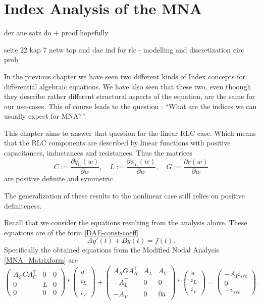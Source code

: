 \chapter{Index Analysis of the MNA}

der ane satz do + proof hopefully

seite 22 kap 7 netw top and dae ind for rlc - modelling and discretization circ prob

In the previous chapter we have seen two different kinds of Index concepts for differential algebraic equations. We have also seen that these two, even thoough they describe rather different structural aspects of the equation, are the same for our use-cases. This of course leads to the question : ``What are the indices we can usually expect for MNA?''.

This chapter aims to answer that question for the linear RLC case. Which means that the RLC components are described by linear functions with positive capacitances, inductances and resistances. Thus the matrices
\begin{displaymath}
	C:=\frac{\partial q_C(w)}{\partial w}, \quad L:=\frac{\partial \phi_L(w)}{\partial w}, \quad G:=\frac{\partial r(w)}{\partial w}
\end{displaymath}
are positive definite and symmetric.

The generalization of these results to the nonlinear case still relies on positive definiteness.

Recall that we consider the equations resulting from the analysis above. These equations are of the form \ref{DAE-const-coeff}
\begin{displaymath}
	A y'(t) + B y(t) = f(t).
\end{displaymath}
Specifically the obtained equations from the Modified Nodal Analysis \ref{MNA_Matrixform} are
\begin{displaymath}
	\begin{pmatrix}
		A_C C A_C^\top & 0 & 0 \\
		0 & L & 0 \\
		0 & 0 & 0
	\end{pmatrix}
	*
	\begin{pmatrix}
		\dot{u} \\
		\dot{i_L} \\
		\dot{i_V}
	\end{pmatrix}
	+
	\begin{pmatrix}
		A_R G A_R^\top & A_L & A_V \\
		-A_L^\top & 0 & 0 \\
		-A_V^\top & 0 & 0 ä
	\end{pmatrix}
	*
	\begin{pmatrix}
		u \\
		i_L \\
		i_V
	\end{pmatrix}
	=
	\begin{pmatrix}
		-A_I i_{src} \\
		0 \\
		-v_{src}
	\end{pmatrix}.
\end{displaymath}


